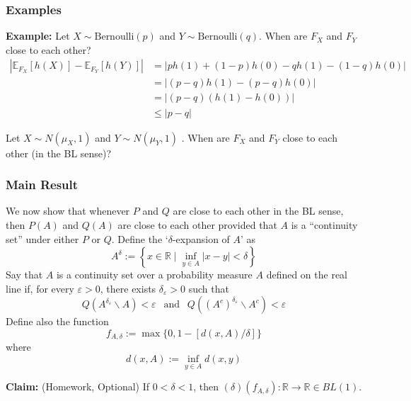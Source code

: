 \documentclass[11pt]{article} %
\begin{document}
\subsubsection{Examples}

\textbf{Example:} Let $X \sim \text{Bernoulli} (p)$ and $Y \sim \text{Bernoulli} (q)$. When are $F_X$ and $F_Y$ close to each other?
\begin{align*}
	\left| \mathbb{E}_{F_X} [ h(X)] - \mathbb{E}_{F_Y} [h(Y)] \right| &= \left| p h(1) + (1-p) h(0) - q h(1) - (1-q) h(0) \right| \\
	&= \left| (p-q) h(1) - (p-q) h(0) \right| \\
	&= \left| (p-q)( h(1) - h(0)) \right| \\
	&\leq | p - q |
\end{align*}

 Let $X \sim N (\mu_X, 1)$ and $Y \sim N (\mu_Y, 1)$ . When are $F_X$ and $F_Y$ close to each other (in the BL sense)?

\subsubsection{Main Result}

We now show that whenever $P$ and $Q$ are close to each other in the BL sense, then $P(A)$ and $Q(A)$ are close to each other provided that $A$ is a ``continuity set'' under either $P$ or $Q$. Define the `$\delta$-expansion of $A$' as
\begin{equation}
	A^\delta := \left\{ x \in \mathbb{R} \mid \inf_{y \in A} | x - y | < \delta \right\}
\end{equation}
Say that $A$ is a continuity set over a probability measure $A$ defined on the real line if, for every $\varepsilon > 0$, there exists $\delta_\varepsilon > 0$ such that
\begin{equation}
	Q ( A^{\delta_\varepsilon} \backslash A ) < \varepsilon \ \ \text{ and } \ \ Q ( (A^c)^{\delta_\varepsilon} \backslash A^c ) < \varepsilon 
\end{equation}
Define also the function 
\begin{equation}
	f_{A, \delta} := \max\{ 0, 1 - [d(x,A)/\delta] \} 
\end{equation}
where
\begin{equation}
	d(x,A) := \inf_{y \in A} d(x,y)
\end{equation}

\noindent \textbf{Claim:} (Homework, Optional) If $0 < \delta < 1$, then $(\delta) (f_{A,\delta}) : \mathbb{R} \to \mathbb{R} \in BL(1)$.
\end{document}
